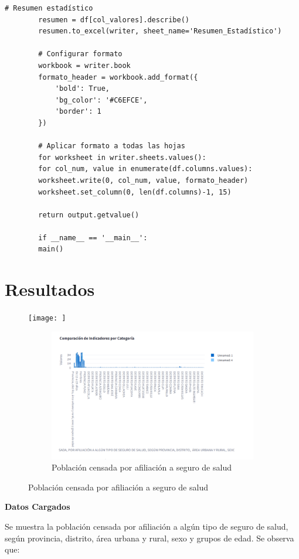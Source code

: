 \begin{lstlisting}[caption={Análisis de Benchmarks con Escalado - INETI}]
		# Resumen estadístico
		resumen = df[col_valores].describe()
		resumen.to_excel(writer, sheet_name='Resumen_Estadístico')
		
		# Configurar formato
		workbook = writer.book
		formato_header = workbook.add_format({
			'bold': True,
			'bg_color': '#C6EFCE',
			'border': 1
		})
		
		# Aplicar formato a todas las hojas
		for worksheet in writer.sheets.values():
		for col_num, value in enumerate(df.columns.values):
		worksheet.write(0, col_num, value, formato_header)
		worksheet.set_column(0, len(df.columns)-1, 15)
		
		return output.getvalue()
		
		if __name__ == '__main__':
		main()
	\end{lstlisting}
	
	\section{Resultados}
	
	\begin{figure}[H]
		\centering
		\texttt{[image: ]}
		\begin{figure}
			\centering
			\includegraphics[width=1.0\linewidth]{image.png}
			\caption{Población censada por afiliación a seguro de salud}
			\label{fig:enter-label}
		\end{figure}
		\caption{Población censada por afiliación a seguro de salud}
		\label{fig:datos}
	\end{figure}
	
	\textbf{Datos Cargados}
	
	Se muestra la población censada por afiliación a algún tipo de seguro de salud, según provincia, distrito, área urbana y rural, sexo y grupos de edad. Se observa que:
	
